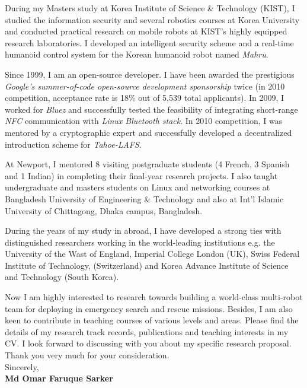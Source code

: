 \documentclass[10.9pt]{article}
\begin{document}
During my Masters study at Korea Institute of Science \& Technology (KIST), I studied the information security and several robotics courses at Korea University and conducted practical research on mobile robots at KIST's highly equipped research laboratories. I developed an intelligent security scheme and a real-time humanoid control system for the Korean humanoid robot named \textit{Mahru}.

Since 1999, I am an open-source developer. I have been awarded the  prestigious \textit{ Google's summer-of-code open-source development sponsorship} twice (in 2010 competition, acceptance rate is 18\% out of 5,539 total applicants). In 2009, I worked for \textit{Bluez} and successfully tested the feasibility of integrating short-range \textit{NFC} communication with \textit{Linux Bluetooth stack}. In 2010 competition, I was mentored by a cryptographic expert and successfully developed a decentralized introduction scheme for \textit{Tahoe-LAFS}.

At Newport, I mentored 8 visiting postgraduate students (4 French, 3 Spanish and 1 Indian) in completing their final-year research projects. I also taught undergraduate and masters students on Linux and networking courses at Bangladesh University of Engineering \& Technology and also at Int'l Islamic University of Chittagong, Dhaka campus, Bangladesh.


During the years of my study in abroad, I have developed a strong ties with  distinguished researchers working in the world-leading institutions e.g. the University of the Wast of England, Imperial College London (UK),  Swiss Federal Institute of Technology, (Switzerland) and Korea Advance Institute of Science and Technology (South Korea). 

Now I am highly interested to research towards building a world-class multi-robot team for deploying in emergency search and rescue missions.  Besides, I am also keen to contribute in teaching courses of various levels and areas. Please find the details of my research track records, publications and teaching interests in my CV. I look forward to discussing with you about my specific research proposal.\\[1em]
Thank you very much for your consideration.\\[1.5em]
Sincerely,\\[1em] %
%
{\bfseries Md Omar Faruque Sarker}%
%
\end{document}
